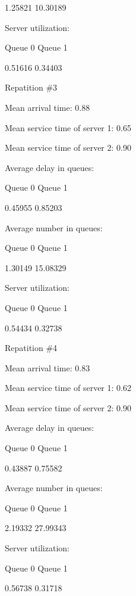\documentclass{article}
\begin{document}
1.25821		10.30189		



Server utilization:

Queue 0		Queue 1		



0.51616		0.34403		



 Repatition \#3

Mean arrival time: 0.88

Mean service time of server 1: 0.65

Mean service time of server 2: 0.90



Average delay in queues:

Queue 0		Queue 1		



0.45955		0.85203		



Average number in queues:

Queue 0		Queue 1		



1.30149		15.08329		



Server utilization:

Queue 0		Queue 1		



0.54434		0.32738		



 Repatition \#4

Mean arrival time: 0.83

Mean service time of server 1: 0.62

Mean service time of server 2: 0.90



Average delay in queues:

Queue 0		Queue 1		



0.43887		0.75582		



Average number in queues:

Queue 0		Queue 1		



2.19332		27.99343		



Server utilization:

Queue 0		Queue 1		



0.56738		0.31718		
\end{document}
